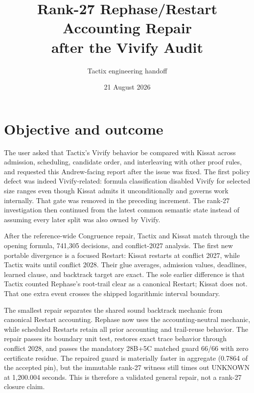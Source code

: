 \documentclass[11pt]{article}
\title{Rank-27 Rephase/Restart Accounting Repair\\after the Vivify Audit}
\author{Tactix engineering handoff}
\date{21 August 2026}
\begin{document}
\maketitle

\section*{Objective and outcome}
The user asked that Tactix's Vivify behavior be compared with Kissat across
admission, scheduling, candidate order, and interleaving with other proof
rules, and requested this Andrew-facing report after the issue was fixed.  The
first policy defect was indeed Vivify-related: formula classification disabled
Vivify for selected size ranges even though Kissat admits it unconditionally
and governs work internally.  That gate was removed in the preceding
increment.  The rank-27 investigation then continued from the latest common
semantic state instead of assuming every later split was also owned by
Vivify.

After the reference-wide Congruence repair, Tactix and Kissat match through the
opening formula, 741,305 decisions, and conflict-2027 analysis.  The first new
portable divergence is a focused Restart: Kissat restarts at conflict 2027,
while Tactix waits until conflict 2028.  Their glue averages, admission values,
deadlines, learned clause, and backtrack target are exact.  The sole earlier
difference is that Tactix counted Rephase's root-trail clear as a canonical
Restart; Kissat does not.  That one extra event crosses the shipped
logarithmic interval boundary.

The smallest repair separates the shared sound backtrack mechanic from
canonical Restart accounting.  Rephase now uses the accounting-neutral
mechanic, while scheduled Restarts retain all prior accounting and trail-reuse
behavior.  The repair passes its boundary unit test, restores exact trace
behavior through conflict 2028, and passes the mandatory 28B+5C matched guard
66/66 with zero certificate residue.  The repaired guard is materially faster
in aggregate (0.7864 of the accepted pin), but the immutable rank-27 witness
still times out UNKNOWN at 1,200.004 seconds.  This is therefore a validated
general repair, not a rank-27 closure claim.
\end{document}
